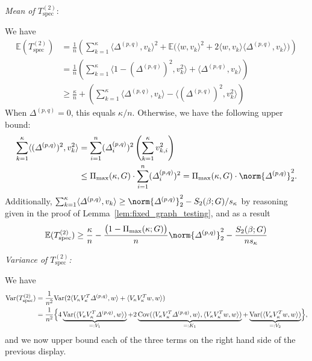 \documentclass{article}
\newcommand{\Var}{\mathrm{Var}}
\newcommand{\Cov}{\mathrm{Cov}}
\newcommand{\1}{\mathbf{1}}
\newcommand{\vardeltapq}{\varDelta^{(p,q)}}
\newcommand{\Ebb}{\mathbb{E}}
\newcommand{\dotp}[2]{\langle #1, #2 \rangle}
\newcommand{\spec}{\mathrm{spec}}
\theoremstyle{alden}
\theoremstyle{aldenthm}
\theoremstyle{definition}
\theoremstyle{remark}
\begin{document}
\vspace{.2 in}

\textit{Mean of $T_{\spec}^{(2)}$}:

We have
\begin{align*}
\Ebb(T_{\spec}^{(2)}) & = \frac{1}{n}\left(\sum_{k = 1}^{\kappa} \dotp{\vardeltapq}{v_k}^2 + \Ebb\bigl(\dotp{w}{v_k}^2 + 2 \dotp{w}{v_k} \dotp{\vardeltapq}{v_k}\bigr)\right) \\
& = \frac{1}{n}\left(\sum_{k = 1}^{\kappa} \dotp{1 - (\vardeltapq)^2}{v_k^2} + \dotp{\vardeltapq}{v_k}\right) \\
& \geq \frac{\kappa}{n} + \left(\sum_{k = 1}^{\kappa}\dotp{\vardeltapq}{v_k} - \dotp{(\vardeltapq)^2}{v_k^2}\right)
\end{align*}
When $\vardeltapq = 0$, this equals $\kappa/n$. Otherwise, we have the following upper bound:
\begin{align*}
\sum_{k = 1}^{\kappa} \dotp{(\vardeltapq)^2}{v_k^2}  & = \sum_{i = 1}^{n} (\vardeltapq_{i})^2 \left(\sum_{k = 1}^{\kappa} v_{k,i}^2 \right)\\
& \leq \Pi_{\max}(\kappa,G) \cdot \sum_{i = 1}^{n} (\vardeltapq_{i})^2 = \Pi_{\max}(\kappa,G) \cdot \norm{\vardeltapq}_2^2.
\end{align*}
Additionally, $\sum_{k = 1}^{\kappa}\dotp{\vardeltapq}{v_k} \geq \norm{\vardeltapq}_2^2 - S_2(\beta;G)/s_{\kappa}$ by reasoning given in the proof of Lemma~\ref{lem:fixed_graph_testing}, and as a result 
\begin{equation*}
\Ebb(T_{\spec}^{(2)}) \geq \frac{\kappa}{n} -  \frac{\bigl(1 - \Pi_{\max}(\kappa;G)\bigr)}{n} \norm{\vardeltapq}_2^2 - \frac{S_2(\beta;G)}{ns_{\kappa}}
\end{equation*}

\vspace{.2 in}
\textit{Variance of $T_{\spec}^{(2)}$:}

We have
\begin{align}
\Var(T_{\spec}^{(2)}) & = \frac{1}{n^2}\Var(2\dotp{V_{\kappa}V_{\kappa}^T\vardeltapq}{w} + \dotp{V_{\kappa}V_{\kappa}^Tw}{w}) \nonumber \\
& = \frac{1}{n^2}\Bigl\{4\underbrace{\Var(\dotp{V_{\kappa}V_{\kappa}^T\vardeltapq}{w})}_{=: V_1} + 2\underbrace{\Cov(\dotp{V_{\kappa}V_{\kappa}^T\vardeltapq}{w},\dotp{V_{\kappa}V_{\kappa}^Tw}{w})}_{=: K_1} + \underbrace{\Var(\dotp{V_{\kappa}V_{\kappa}^Tw}{w})}_{=:V_2}\Bigr\}, \label{eqn:var}
\end{align}
and we now upper bound each of the three terms on the right hand side of the previous display.
\end{document}
